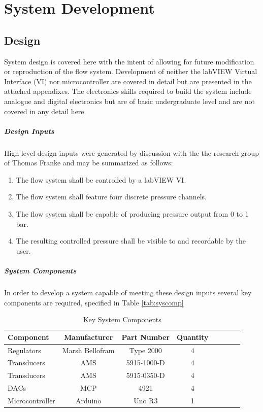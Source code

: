 \chapter{System Development}

\section{Design}

System design is covered here with the intent of allowing for future modification or reproduction of the flow system. Development of neither the labVIEW Virtual Interface (VI) nor microcontroller are covered in detail but are presented in the attached appendixes. The electronics skills required to build the system include analogue and digital electronics but are of basic undergraduate level and are not covered in any detail here. 

\qquad


\paragraph{Design Inputs} High level design inputs were generated by discussion with the the research group of Thomas Franke and may be summarized as follows:


\begin{enumerate}
\item The flow system shall be controlled by a labVIEW VI.
\item The flow system shall feature four discrete pressure channels.
\item The flow system shall be capable of producing pressure output 
from 0 to 1 bar.
\item The resulting controlled pressure shall be visible to and recordable by the user.
\end{enumerate}

\clearpage

\paragraph{System Components}In order to develop a system capable of meeting these design inputs several key components are required, specified in Table \vref{tab:syscomp}

\qquad

 
\begin{table}[H]
\begin{center}
\begin{tabular}{l*{6}{c}r}
Component & Manufacturer & Part Number & Quantity \\
\hline
Regulators & Marsh Bellofram & Type 2000 & 4 \\
Transducers & AMS & 5915-1000-D & 4\\
Transducers & AMS & 5915-0350-D & 4\\
DACs & MCP & 4921 & 4\\
Microcontroller & Arduino & Uno R3 & 1 \\
\end{tabular}
\caption [Key System Components]{Key System Components} 
\label{tab:syscomp}
\end{center}
\end{table}

